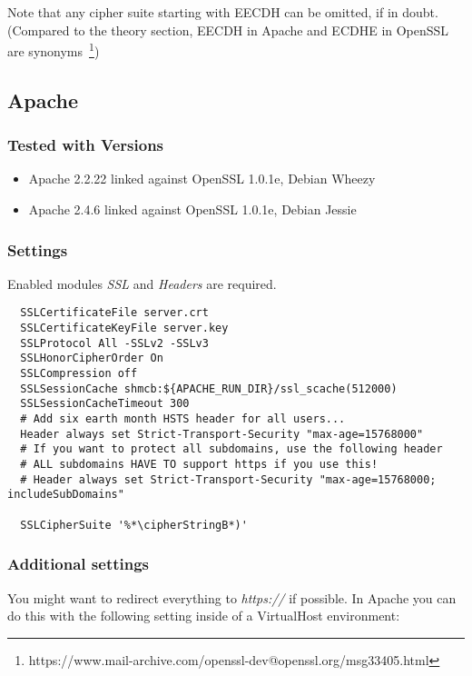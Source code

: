 Note that any cipher suite starting with EECDH can be omitted, if in doubt.
(Compared to the theory section, EECDH in Apache and ECDHE in OpenSSL are
synonyms~\footnote{https://www.mail-archive.com/openssl-dev@openssl.org/msg33405.html})

\subsection{Apache}

\subsubsection{Tested with Versions} 
\begin{itemize}
  \item Apache 2.2.22 linked against OpenSSL 1.0.1e, Debian Wheezy
  \item Apache 2.4.6 linked against OpenSSL 1.0.1e, Debian Jessie
\end{itemize}


\subsubsection{Settings}
Enabled modules \emph{SSL} and \emph{Headers} are required.

\begin{lstlisting}
  SSLCertificateFile server.crt
  SSLCertificateKeyFile server.key
  SSLProtocol All -SSLv2 -SSLv3 
  SSLHonorCipherOrder On
  SSLCompression off
  SSLSessionCache shmcb:${APACHE_RUN_DIR}/ssl_scache(512000)
  SSLSessionCacheTimeout 300
  # Add six earth month HSTS header for all users...
  Header always set Strict-Transport-Security "max-age=15768000"
  # If you want to protect all subdomains, use the following header
  # ALL subdomains HAVE TO support https if you use this!
  # Header always set Strict-Transport-Security "max-age=15768000; includeSubDomains"

  SSLCipherSuite '%*\cipherStringB*)'
\end{lstlisting}

\subsubsection{Additional settings}
You might want to redirect everything to \emph{https://} if possible. In Apache
you can do this with the following setting inside of a VirtualHost environment:

